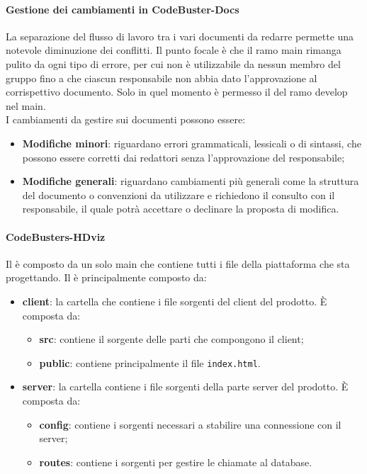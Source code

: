 \paragraph{Gestione dei cambiamenti in CodeBuster-Docs}
La separazione del flusso di lavoro tra i vari documenti da redarre permette una notevole diminuzione dei conflitti. Il punto focale è che il ramo main rimanga pulito da ogni tipo di errore, per cui non è utilizzabile da nessun membro del gruppo fino a che ciascun responsabile non abbia dato l'approvazione al corrispettivo documento. Solo in quel momento è permesso il  del ramo develop nel main. \\
I cambiamenti da gestire sui documenti possono essere:
\begin{itemize}
	\item \textbf{Modifiche minori}: riguardano errori grammaticali, lessicali o di sintassi, che possono essere corretti dai redattori senza l'approvazione del responsabile;
	\item \textbf{Modifiche generali}: riguardano cambiamenti più generali come la struttura del documento o convenzioni da utilizzare e richiedono il consulto con il responsabile, il quale potrà accettare o declinare la proposta di modifica.
\end{itemize}

\paragraph{CodeBusters-HDviz}
Il  è composto da un solo  main che contiene tutti i file della piattaforma che \Gruppo{} sta progettando. Il  è principalmente composto da:
\begin{itemize}
	\item \textbf{client}: la cartella che contiene i file sorgenti del client del prodotto. È composta da:
	\begin{itemize}
		\item \textbf{src}: contiene il sorgente delle parti che compongono il client;
		\item \textbf{public}: contiene principalmente il file \texttt{index.html}.
	\end{itemize}
	\item \textbf{server}: la cartella contiene i file sorgenti della parte server del prodotto. È composta da:
	\begin{itemize}
		\item \textbf{config}: contiene i sorgenti necessari a stabilire una connessione con il server; 
		\item \textbf{routes}: contiene i sorgenti per gestire le chiamate al database.
	\end{itemize}
\end{itemize}

